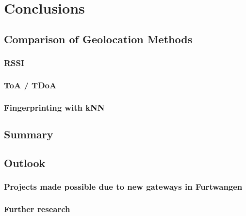 \chapter{Conclusions}

\section{Comparison of Geolocation Methods}

\subsection{\ac{RSSI}}

\subsection{\ac{ToA} / \ac{TDoA}}

\subsection{Fingerprinting with \ac{kNN}}

\section{Summary}


\section{Outlook}

\subsection{Projects made possible due to new gateways in Furtwangen}

\subsection{Further research}

